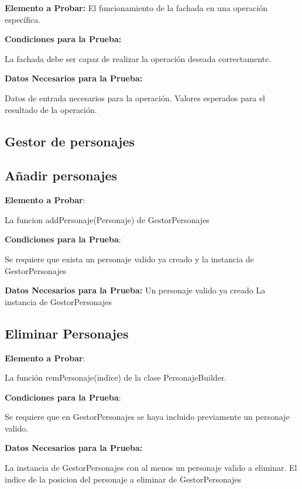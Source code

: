 \documentclass{article}
\begin{document}
\begin{itemize}
   \textbf{ Elemento a Probar:} 
   El funcionamiento de la fachada en una operación específica.
   
    \textbf{Condiciones para la Prueba:}
    
        La fachada debe ser capaz de realizar la operación deseada correctamente.
        
   \textbf{ Datos Necesarios para la Prueba:}
   
        Datos de entrada necesarios para la operación.
        Valores esperados para el resultado de la operación.

\end{itemize}

\subsection{Gestor de personajes}

\subsection{Añadir personajes}

\textbf{Elemento a Probar}: 

La funcion addPersonaje(Personaje) de GestorPersonajes

\textbf{Condiciones para la Prueba}:

        Se requiere que exista un personaje valido ya creado y la instancia de GestorPersonajes
   
\textbf{ Datos Necesarios para la Prueba:}
        Un personaje valido ya creado
        La instancia de GestorPersonajes

\subsection{Eliminar Personajes}

\textbf{Elemento a Probar}:

 La función remPersonaje(indice) de la clase PersonajeBuilder.

\textbf{Condiciones para la Prueba}:

        Se requiere que en GestorPersonajes se haya incluido previamente un personaje valido.
        
    \textbf{Datos Necesarios para la Prueba:}
    
        La instancia de GestorPersonajes con al menos un personaje valido a eliminar.
        El indice de la posicion del personaje a eliminar de GestorPersonajes
\end{document}

